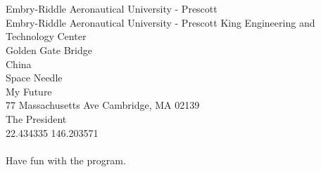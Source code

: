 \documentclass[11pt]{article}   %
\begin{document}
\\\\
Embry-Riddle Aeronautical University - Prescott\\
Embry-Riddle Aeronautical University - Prescott King Engineering and Technology Center\\
Golden Gate Bridge\\
China\\
Space Needle\\
My Future\\
77 Massachusetts Ave Cambridge, MA 02139\\
The President\\
22.434335 146.203571\\\\
Have fun with the program.
\end{document}
